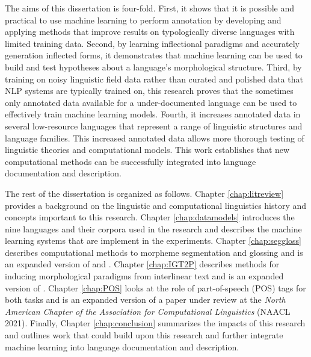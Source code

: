 The aims of this dissertation is four-fold. First, it shows that it is possible and practical to use machine learning to perform annotation by developing and applying methods that improve results on typologically diverse languages with limited training data. Second, by learning inflectional paradigms and accurately generation inflected forms, it demonstrates that machine learning can be used to build and test hypotheses about a language's morphological structure. Third, by training on noisy linguistic field data rather than curated and polished data that NLP systems are typically trained on, this research proves that the sometimes only annotated data available for a under-documented language can be used to effectively train machine learning models. 
Fourth,  it increases annotated data in several low-resource languages that represent a range of linguistic structures and language families. This increased annotated data allows more thorough testing of linguistic theories and computational models.
This work establishes that new computational methods can be successfully integrated into language documentation and description. 


The rest of the dissertation is organized as follows. Chapter \ref{chap:litreview} provides a background on the linguistic and computational linguistics history and concepts important to this research.
Chapter \ref{chap:datamodels} introduces the nine languages and their corpora used in the research and describes the machine learning systems that are implement in the experiments.
Chapter \ref{chap:seggloss} describes computational methods to morpheme segmentation and glossing and is an expanded version of \citet{moeller_automatic_2018} and \citet{moeller_integrating_2021}. Chapter \ref{chap:IGT2P} describes methods for inducing morphological paradigms from interlinear text and is an expanded version of \citet{moeller_igt2p_2020}. Chapter \ref{chap:POS} looks at the role of part-of-speech (POS) tags for both tasks and is an expanded version of a paper under review at the \textit{North American Chapter of the Association for Computational Linguistics} (NAACL 2021). Finally, Chapter \ref{chap:conclusion} summarizes the impacts of this research and outlines work that could build upon this research and further integrate machine learning into language documentation and description.